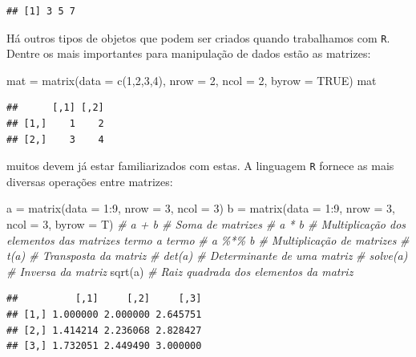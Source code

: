 \documentclass[
]{book}
\newenvironment{Shaded}{\begin{snugshade}}{\end{snugshade}}
\newcommand{\AttributeTok}[1]{\textcolor[rgb]{0.77,0.63,0.00}{#1}}
\newcommand{\CommentTok}[1]{\textcolor[rgb]{0.56,0.35,0.01}{\textit{#1}}}
\newcommand{\ConstantTok}[1]{\textcolor[rgb]{0.00,0.00,0.00}{#1}}
\newcommand{\DecValTok}[1]{\textcolor[rgb]{0.00,0.00,0.81}{#1}}
\newcommand{\FunctionTok}[1]{\textcolor[rgb]{0.00,0.00,0.00}{#1}}
\newcommand{\NormalTok}[1]{#1}
\newcommand{\OtherTok}[1]{\textcolor[rgb]{0.56,0.35,0.01}{#1}}
\newcommand{\SpecialCharTok}[1]{\textcolor[rgb]{0.00,0.00,0.00}{#1}}
\begin{document}
\begin{verbatim}
## [1] 3 5 7
\end{verbatim}

Há outros tipos de objetos que podem ser criados quando trabalhamos com \texttt{R}. Dentre os mais importantes para manipulação de dados estão as matrizes:

\begin{Shaded}
\begin{Highlighting}[]
\NormalTok{mat }\OtherTok{=} \FunctionTok{matrix}\NormalTok{(}\AttributeTok{data =} \FunctionTok{c}\NormalTok{(}\DecValTok{1}\NormalTok{,}\DecValTok{2}\NormalTok{,}\DecValTok{3}\NormalTok{,}\DecValTok{4}\NormalTok{), }\AttributeTok{nrow =} \DecValTok{2}\NormalTok{, }\AttributeTok{ncol =} \DecValTok{2}\NormalTok{,}
           \AttributeTok{byrow =} \ConstantTok{TRUE}\NormalTok{)}
\NormalTok{mat}
\end{Highlighting}
\end{Shaded}

\begin{verbatim}
##      [,1] [,2]
## [1,]    1    2
## [2,]    3    4
\end{verbatim}

muitos devem já estar familiarizados com estas. A linguagem \texttt{R} fornece as mais diversas operações entre matrizes:

\begin{Shaded}
\begin{Highlighting}[]
\NormalTok{a }\OtherTok{=} \FunctionTok{matrix}\NormalTok{(}\AttributeTok{data =} \DecValTok{1}\SpecialCharTok{:}\DecValTok{9}\NormalTok{, }\AttributeTok{nrow =} \DecValTok{3}\NormalTok{, }\AttributeTok{ncol =} \DecValTok{3}\NormalTok{)}
\NormalTok{b }\OtherTok{=} \FunctionTok{matrix}\NormalTok{(}\AttributeTok{data =} \DecValTok{1}\SpecialCharTok{:}\DecValTok{9}\NormalTok{, }\AttributeTok{nrow =} \DecValTok{3}\NormalTok{, }\AttributeTok{ncol =} \DecValTok{3}\NormalTok{, }\AttributeTok{byrow =}\NormalTok{ T)}
\CommentTok{\# a + b \# Soma de matrizes}
\CommentTok{\# a * b \# Multiplicação dos elementos das matrizes termo a termo}
\CommentTok{\# a \%*\% b \# Multiplicação de matrizes}
\CommentTok{\# t(a) \# Transposta da matriz}
\CommentTok{\# det(a) \# Determinante de uma matriz}
\CommentTok{\# solve(a) \# Inversa da matriz}
\FunctionTok{sqrt}\NormalTok{(a) }\CommentTok{\# Raiz quadrada dos elementos da matriz}
\end{Highlighting}
\end{Shaded}

\begin{verbatim}
##          [,1]     [,2]     [,3]
## [1,] 1.000000 2.000000 2.645751
## [2,] 1.414214 2.236068 2.828427
## [3,] 1.732051 2.449490 3.000000
\end{verbatim}
\end{document}

